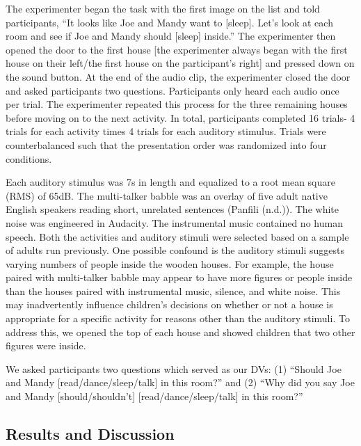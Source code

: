 \documentclass[10pt, letterpaper]{article}
\begin{document}
The experimenter began the task with the first image on the list and
told participants, ``It looks like Joe and Mandy want to {[}sleep{]}.
Let's look at each room and see if Joe and Mandy should {[}sleep{]}
inside.'' The experimenter then opened the door to the first house
{[}the experimenter always began with the first house on their left/the
first house on the participant's right{]} and pressed down on the sound
button. At the end of the audio clip, the experimenter closed the door
and asked participants two questions. Participants only heard each audio
once per trial. The experimenter repeated this process for the three
remaining houses before moving on to the next activity. In total,
participants completed 16 trials- 4 trials for each activity times 4
trials for each auditory stimulus. Trials were counterbalanced such that
the presentation order was randomized into four conditions.

Each auditory stimulus was 7s in length and equalized to a root mean
square (RMS) of 65dB. The multi-talker babble was an overlay of five
adult native English speakers reading short, unrelated sentences
(Panfili (n.d.)). The white noise was engineered in Audacity. The
instrumental music contained no human speech. Both the activities and
auditory stimuli were selected based on a sample of adults run
previously. One possible confound is the auditory stimuli suggests
varying numbers of people inside the wooden houses. For example, the
house paired with multi-talker babble may appear to have more figures or
people inside than the houses paired with instrumental music, silence,
and white noise. This may inadvertently influence children's decisions
on whether or not a house is appropriate for a specific activity for
reasons other than the auditory stimuli. To address this, we opened the
top of each house and showed children that two other figures were
inside.

We asked participants two questions which served as our DVs: (1)
``Should Joe and Mandy {[}read/dance/sleep/talk{]} in this room?'' and
(2) ``Why did you say Joe and Mandy {[}should/shouldn't{]}
{[}read/dance/sleep/talk{]} in this room?''

\hypertarget{results-and-discussion}{%
\subsection{Results and Discussion}\label{results-and-discussion}}
\end{document}
